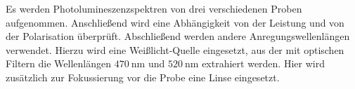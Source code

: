 Es werden Photolumineszenzspektren von drei verschiedenen Proben aufgenommen. Anschließend wird eine Abhängigkeit von der
Leistung und von der Polarisation überprüft. Abschließend werden andere Anregungswellenlängen verwendet. Hierzu wird
eine Weißlicht-Quelle eingesetzt, aus der mit optischen Filtern die Wellenlängen
$\SI{470}{\nano\meter}$ und $\SI{520}{\nano\meter}$ extrahiert werden. Hier wird zusätzlich zur Fokussierung vor die Probe eine
Linse eingesetzt.
